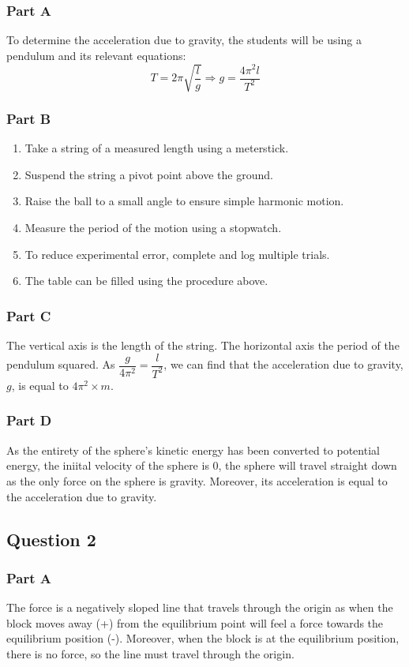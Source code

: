 \documentclass[]{scrartcl}
\begin{document}
\subsubsection*{Part A}
  To determine the acceleration due to gravity, the students will be using a pendulum and its relevant equations:
  $$T = 2\pi\sqrt{\dfrac{l}{g}}\Longrightarrow  \boxed{g = \dfrac{4\pi^2 l}{T^2}}$$
\subsubsection*{Part B}
  \begin{enumerate}
    \item Take a string of a measured length using a meterstick.
    \item Suspend the string a pivot point above the ground.
    \item Raise the ball to a small angle to ensure simple harmonic motion.
    \item Measure the period of the motion using a stopwatch.
    \item To reduce experimental error, complete and log multiple trials.
    \item The table can be filled using the procedure above.
  \end{enumerate}
\subsubsection*{Part C}
  The vertical axis is the length of the string. The horizontal axis the period of the pendulum squared. As $\dfrac{g}{4\pi^2} = \dfrac{l}{T^2}$, we can find that the acceleration due to gravity, $g$, is equal to $4\pi^2 \times m$.
\subsubsection*{Part D}
  As the entirety of the sphere's kinetic energy has been converted to potential energy, the iniital velocity of the sphere is 0, the sphere will travel straight down as the only force on the sphere is gravity. Moreover, its acceleration is equal to the acceleration due to gravity.
\subsection*{Question 2}
\subsubsection*{Part A}
  The force is a negatively sloped line that travels through the origin as when the block moves away (+) from the equilibrium point will feel a force towards the equilibrium position (-). Moreover, when the block is at the equilibrium position, there is no force, so the line must travel through the origin.
\end{document}
